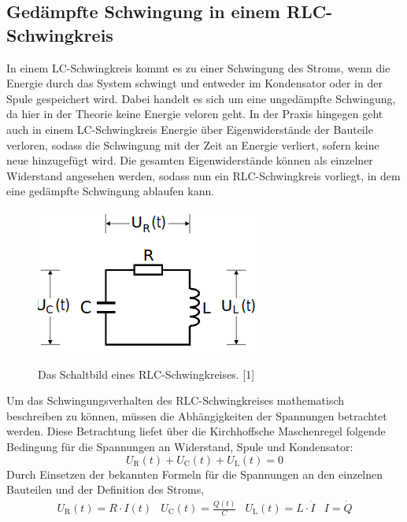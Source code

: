 \documentclass[titlepage = firstcover]{scrartcl}
\begin{document}
        \subsection{Gedämpfte Schwingung in einem RLC-Schwingkreis}
            In einem LC-Schwingkreis kommt es zu einer Schwingung des Stroms, wenn die Energie durch das System schwingt und entweder im Kondensator oder in
            der Spule gespeichert wird. Dabei handelt es sich um eine ungedämpfte Schwingung, da hier in der Theorie keine Energie veloren geht. In der Praxis
            hingegen geht auch in einem LC-Schwingkreis Energie über Eigenwiderstände der Bauteile verloren, sodass die Schwingung mit der Zeit an Energie 
            verliert, sofern keine neue hinzugefügt wird. Die gesamten Eigenwiderstände können als einzelner Widerstand angesehen werden, sodass nun ein 
            RLC-Schwingkreis vorliegt, in dem eine gedämpfte Schwingung ablaufen kann.
            \begin{figure}[h]
                \centering
                \caption{Das Schaltbild eines RLC-Schwingkreises. [1]}
                \includegraphics[width = 0.4\linewidth]{RLC.png}
                \label{fig:RLC}
            \end{figure}
            \FloatBarrier
            Um das Schwingungsverhalten des RLC-Schwingkreises mathematisch beschreiben zu können, müssen die Abhängigkeiten der Spannungen betrachtet werden.
            Diese Betrachtung liefet über die Kirchhoffsche Maschenregel folgende Bedingung für die Spannungen an Widerstand, Spule und Kondensator:
            \begin{equation}
                U_{\text{R}}(t) + U_{\text{C}}(t) + U_{\text{L}}(t) = 0
                \label{eqn:Masche}
            \end{equation}  
            Durch Einsetzen der bekannten Formeln für die Spannungen an den einzelnen Bauteilen und der Definition des Stroms,
            \begin{align}
                U_{\text{R}}(t) = R \cdot I(t) & U_{\text{C}}(t) = \frac{Q(t)}{C} & U_{\text{L}}(t) = L \cdot \dot{I} & I = \dot{Q} 
                \label{eqn:Spannungen}
            \end{align}
\end{document}
